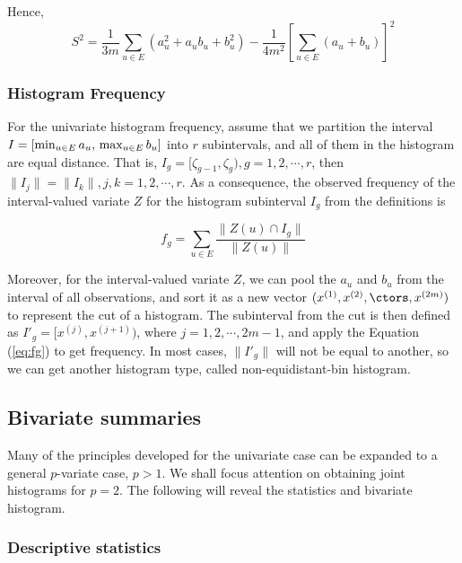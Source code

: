 \documentclass[article]{jss}
\begin{document}
Hence,
\begin{equation}\label{eq:var}
S^2 = \frac{1}{3m} \sum_{u \in E}(a_u^2+a_ub_u+b_u^2)-\frac{1}{4m^2}\left[ \sum_{u \in E}(a_u+b_u) \right]^2
\end{equation}

\subsubsection{Histogram Frequency}\label{sec:hist}

For the univariate histogram frequency, assume that we partition the interval $I=[\min_{u \in E} a_u,\\ \max_{u \in E} b_u]$ into $r$ subintervals, and all of them in the histogram are equal distance. That is, $I_g = [\zeta_{g-1},\zeta_{g}),g=1,2,\cdots,r$, then $\| I_j \| = \| I_k \| , j,k=1,2,\cdots,r$. As a consequence, the observed frequency of the interval-valued variate $Z$ for the histogram subinterval $I_g$ from the definitions is

\begin{equation}\label{eq:fg}
f_g = \sum_{u \in E}\frac{\| Z(u) \cap I_g \|}{\| Z(u) \|}
\end{equation}

Moreover, for the interval-valued variate $Z$, we can pool the $a_u$ and $b_u$ from the interval of all observations, and sort it as a new vector $(x^{(1)},x^{(2)},\ctors,x^{(2m)})$ to represent the cut of a histogram. The subinterval from the cut is then defined as $I'_g = [x^{(j)},x^{(j+1)})$, where $j = 1,2,\cdots, 2m-1$, and apply the Equation (\ref{eq:fg}) to get frequency. In most cases, $\| I'_g \|$ will not be equal to another, so we can get another histogram type, called non-equidistant-bin histogram.


\subsection{Bivariate summaries}

Many of the principles developed for the univariate case can be expanded to a general $p$-variate case, $p > 1$. We shall focus attention on obtaining joint histograms for $p = 2$. The following will reveal the statistics and bivariate histogram.

\subsubsection{Descriptive statistics}
\end{document}

